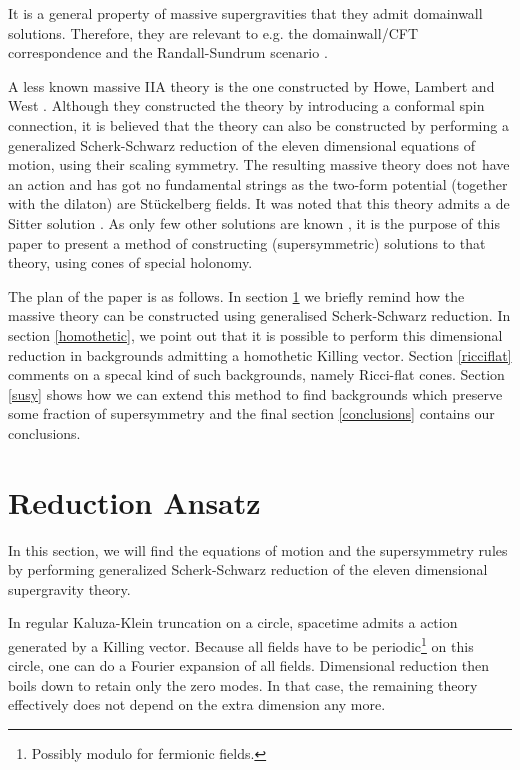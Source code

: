 \documentclass[a4paper,12pt]{article}
\begin{document}
It is a general property of massive supergravities that they admit domainwall solutions. Therefore, they are relevant to e.g. the domainwall/CFT correspondence \cite{Boonstra:1998mp,Behrndt:1999mk} and the Randall-Sundrum scenario \cite{Randall:1999ee,Randall:1999vf}.

A less known massive IIA theory is the one constructed by Howe, Lambert and West \cite{Howe:1998qt}. Although they constructed the theory by introducing a conformal spin connection, it is believed  \cite{Lavrinenko:1998qa} that the theory can also be constructed by performing a generalized Scherk-Schwarz reduction \cite{Scherk:1979zr} of the eleven dimensional equations of motion, using their scaling symmetry. The resulting massive theory does not have an action and has got no fundamental strings as the two-form potential (together with the dilaton) are St\"uckelberg fields. It was noted that this theory admits a de Sitter solution \cite{Lavrinenko:1998qa}. As only few other solutions are known \cite{Howe:1998qt,Chamblin:1999ea,Bergshoeff:2002nv,Chamblin}, it is the purpose of this paper to present a method of constructing (supersymmetric) solutions to that theory, using cones of special holonomy.

The plan of the paper is as follows. In section \ref{ansatz} we briefly remind how the massive theory can be constructed using generalised Scherk-Schwarz reduction. In section \ref{homothetic}, we point out that it is possible to perform this dimensional reduction in backgrounds admitting a homothetic Killing vector. Section \ref{ricciflat} comments on a specal kind of such backgrounds, namely Ricci-flat cones. Section \ref{susy} shows how we can extend this method to find backgrounds which preserve some fraction of supersymmetry and the final section \ref{conclusions} contains our conclusions. 
\section{Reduction Ansatz} \label{ansatz}
In this section, we will find the equations of motion and the supersymmetry rules by performing generalized
Scherk-Schwarz reduction of the eleven dimensional supergravity theory.

In regular Kaluza-Klein truncation on a circle, spacetime admits a \coordHE{} action generated by a Killing vector. Because all fields have to be periodic\footnote{Possibly modulo \coordHE{} for fermionic fields.} on this circle, one can do a Fourier expansion of all fields. Dimensional reduction then boils down to retain only the zero modes. In that case, the remaining theory effectively does not depend on the extra dimension any more.
\end{document}
